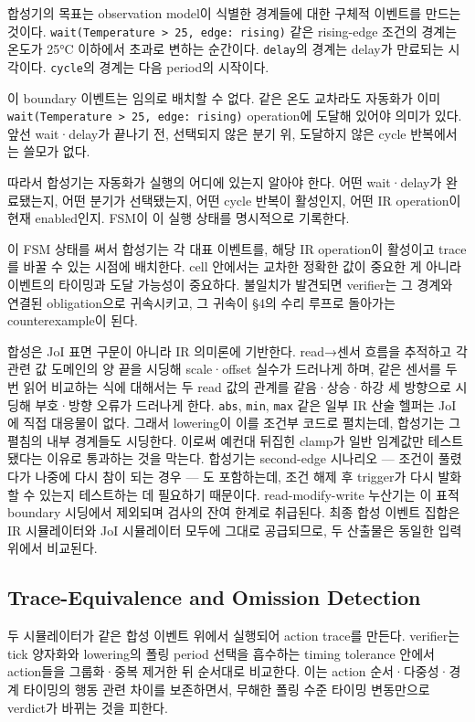 \documentclass[sigconf,nonacm,anonymous,review]{acmart}
\begin{document}
합성기의 목표는 observation model이 식별한 경계들에 대한 구체적 이벤트를 만드는 것이다. \texttt{wait(Temperature > 25, edge: rising)} 같은 rising-edge 조건의 경계는 온도가 25°C 이하에서 초과로 변하는 순간이다. \texttt{delay}의 경계는 delay가 만료되는 시각이다. \texttt{cycle}의 경계는 다음 period의 시작이다.

이 boundary 이벤트는 임의로 배치할 수 없다. 같은 온도 교차라도 자동화가 이미 \texttt{wait(Temperature > 25, edge: rising)} operation에 도달해 있어야 의미가 있다. 앞선 wait·delay가 끝나기 전, 선택되지 않은 분기 위, 도달하지 않은 cycle 반복에서는 쓸모가 없다.

따라서 합성기는 자동화가 실행의 어디에 있는지 알아야 한다. 어떤 wait·delay가 완료됐는지, 어떤 분기가 선택됐는지, 어떤 cycle 반복이 활성인지, 어떤 IR operation이 현재 enabled인지. FSM이 이 실행 상태를 명시적으로 기록한다.

이 FSM 상태를 써서 합성기는 각 대표 이벤트를, 해당 IR operation이 활성이고 trace를 바꿀 수 있는 시점에 배치한다. cell 안에서는 교차한 정확한 값이 중요한 게 아니라 이벤트의 타이밍과 도달 가능성이 중요하다. 불일치가 발견되면 verifier는 그 경계와 연결된 obligation으로 귀속시키고, 그 귀속이 \S4의 수리 루프로 돌아가는 counterexample이 된다.

합성은 JoI 표면 구문이 아니라 IR 의미론에 기반한다. read→센서 흐름을 추적하고 각 관련 값 도메인의 양 끝을 시딩해 scale·offset 실수가 드러나게 하며, 같은 센서를 두 번 읽어 비교하는 식에 대해서는 두 read 값의 관계를 같음·상승·하강 세 방향으로 시딩해 부호·방향 오류가 드러나게 한다. \texttt{abs}, \texttt{min}, \texttt{max} 같은 일부 IR 산술 헬퍼는 JoI에 직접 대응물이 없다. 그래서 lowering이 이를 조건부 코드로 펼치는데, 합성기는 그 펼침의 내부 경계들도 시딩한다. 이로써 예컨대 뒤집힌 clamp가 일반 임계값만 테스트됐다는 이유로 통과하는 것을 막는다. 합성기는 second-edge 시나리오 — 조건이 풀렸다가 나중에 다시 참이 되는 경우 — 도 포함하는데, 조건 해제 후 trigger가 다시 발화할 수 있는지 테스트하는 데 필요하기 때문이다. read-modify-write 누산기는 이 표적 boundary 시딩에서 제외되며 검사의 잔여 한계로 취급된다. 최종 합성 이벤트 집합은 IR 시뮬레이터와 JoI 시뮬레이터 모두에 그대로 공급되므로, 두 산출물은 동일한 입력 위에서 비교된다.

\subsection{Trace-Equivalence and Omission Detection}

두 시뮬레이터가 같은 합성 이벤트 위에서 실행되어 action trace를 만든다. verifier는 tick 양자화와 lowering의 폴링 period 선택을 흡수하는 timing tolerance 안에서 action들을 그룹화·중복 제거한 뒤 순서대로 비교한다. 이는 action 순서·다중성·경계 타이밍의 행동 관련 차이를 보존하면서, 무해한 폴링 수준 타이밍 변동만으로 verdict가 바뀌는 것을 피한다.
\end{document}

